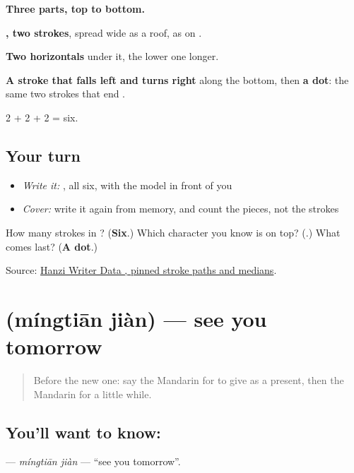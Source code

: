 \begin{quote}
\end{quote}

\textbf{Three parts, top to bottom.}

\textbf{, two strokes}, spread wide as a roof, as on .

\textbf{Two horizontals} under it, the lower one longer.

\textbf{A stroke that falls left and turns right} along the bottom, then \textbf{a dot}: the same two strokes that end .

2 + 2 + 2 = six.

\subsection*{Your turn}
\begin{itemize}
\raggedright
  \item \emph{Write it:} , all six, with the model in front of you
  \item \emph{Cover:} write it again from memory, and count the pieces, not the strokes
\end{itemize}

\begin{tcolorbox}[breakable,colback=teal!4,colframe=teal!35!black,title={Before you move on}]
How many strokes in ? (\textbf{Six}.) Which character you know is on top? (\textbf{}.) What comes last? (\textbf{A dot}.)

Source: \href{https://raw.githubusercontent.com/chanind/hanzi-writer-data/68d10a4b21150cae5e1ebbd223eed289cf32d90c/data/\%E4\%BC\%9A.json}{Hanzi Writer Data , pinned stroke paths and medians}.
\end{tcolorbox}
\section[\texorpdfstring{\zh{明天见} (míngtiān jiàn)}{明天见 (míngtiān jiàn)}]{ (míngtiān jiàn) — see you tomorrow}

\label{lesson:ZH-C76-mingtianjian}



\begin{quote}
Before the new one: say the Mandarin for to give as a present, then the Mandarin for a little while.
\end{quote}

\subsection*{You'll want to know: }
\textbf{} — \emph{míngtiān jiàn} — \textquotedblleft{}see you tomorrow\textquotedblright{}.

